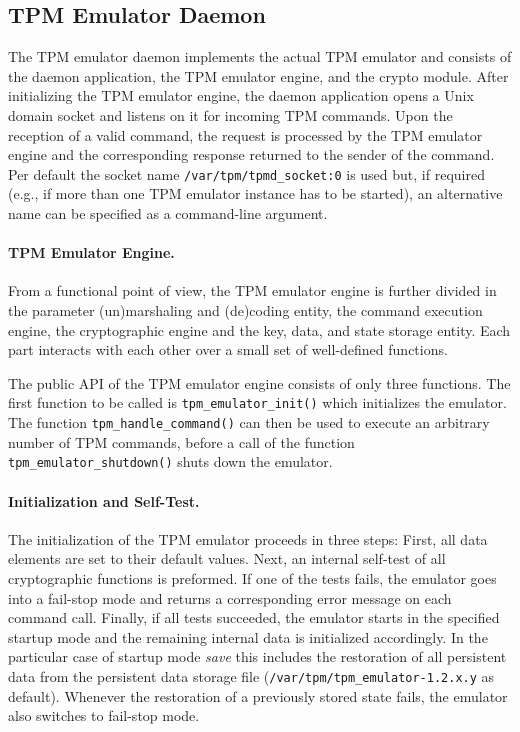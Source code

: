 \documentclass[runningheads]{llncs}
\newcommand{\file}[1]{\small\texttt{#1}\normalsize}
\newcommand{\func}[1]{\small\texttt{#1}\normalsize}
\begin{document}
\subsection{TPM Emulator Daemon}
The TPM emulator daemon implements the actual TPM emulator and consists of
the daemon application, the TPM emulator engine, and the crypto module. After
initializing the TPM emulator engine, the daemon application opens a Unix
domain socket and listens on it for incoming TPM commands. Upon the reception
of a valid command, the request is processed by the TPM emulator engine and
the corresponding response returned to the sender of the command. Per default
the socket name \file{/var/tpm/tpmd\_socket:0} is used but, if required (e.g.,
if more than one TPM emulator instance has to be started), an alternative name
can be specified as a command-line argument.

\paragraph{TPM Emulator Engine.}
From a functional point of view, the TPM emulator engine is further divided
in the parameter (un)marshaling and (de)coding entity, the command execution
engine, the cryptographic engine and the key, data, and state storage entity.
Each part interacts with each other over a small set of well-defined functions.

The public API of the TPM emulator engine consists of only three functions.
The first function to be called is \func{tpm\_emulator\_init()} which
initializes the emulator. The function \func{tpm\_\-handle\_\-command()} can
then be used to execute an arbitrary number of TPM commands, before a call of
the function \func{tpm\_emulator\_shutdown()} shuts down the emulator.

\paragraph{Initialization and Self-Test.}
The initialization of the TPM emulator proceeds in three steps:
First, all data elements are set to their default values.
Next, an internal self-test of all cryptographic functions
is preformed. If one of the tests fails, the emulator goes into a fail-stop
mode and returns a corresponding error message on each command call. Finally,
if all tests succeeded, the emulator starts in the specified startup mode and
the remaining internal data is initialized accordingly. In the particular case
of startup mode \emph{save} this includes the restoration of all persistent
data from the persistent data storage file
(\file{/var/tpm/tpm\_emulator-1.2.x.y} as default).
Whenever the restoration of a previously stored state fails, the emulator
also switches to fail-stop mode.
\end{document}
